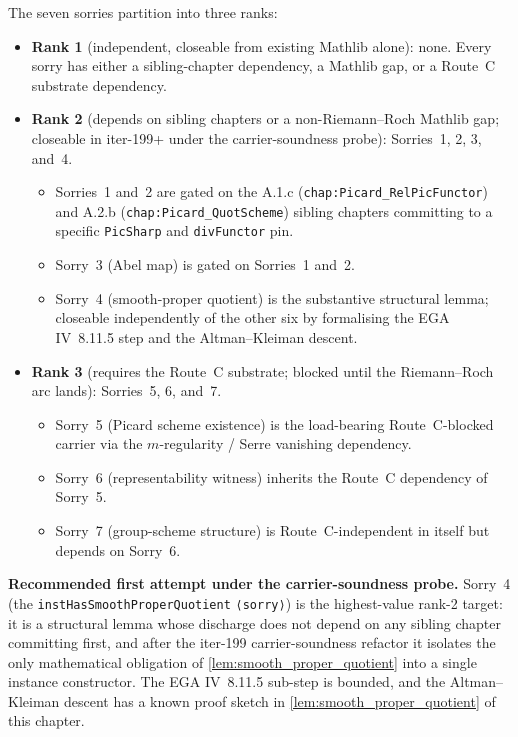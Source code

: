 The seven sorries partition into three ranks:
\begin{itemize}
  \item \textbf{Rank 1} (independent, closeable from existing
    Mathlib alone): none. Every sorry has either a sibling-chapter
    dependency, a Mathlib gap, or a Route~C substrate dependency.
  \item \textbf{Rank 2} (depends on sibling chapters or a
    non-Riemann--Roch Mathlib gap; closeable in iter-199+ under the
    carrier-soundness probe): Sorries~1, 2, 3, and~4.
    \begin{itemize}
      \item Sorries~1 and~2 are gated on the A.1.c
        (\texttt{chap:Picard\_RelPicFunctor}) and A.2.b
        (\texttt{chap:Picard\_QuotScheme}) sibling chapters
        committing to a specific \texttt{PicSharp} and
        \texttt{divFunctor} pin.
      \item Sorry~3 (Abel map) is gated on Sorries~1 and~2.
      \item Sorry~4 (smooth-proper quotient) is the substantive
        structural lemma; closeable independently of the other six
        by formalising the EGA IV~8.11.5 step and the Altman--Kleiman
        descent.
    \end{itemize}
  \item \textbf{Rank 3} (requires the Route~C substrate; blocked
    until the Riemann--Roch arc lands): Sorries~5, 6, and~7.
    \begin{itemize}
      \item Sorry~5 (Picard scheme existence) is the load-bearing
        Route~C-blocked carrier via the $m$-regularity / Serre
        vanishing dependency.
      \item Sorry~6 (representability witness) inherits the Route~C
        dependency of Sorry~5.
      \item Sorry~7 (group-scheme structure) is Route~C-independent
        in itself but depends on Sorry~6.
    \end{itemize}
\end{itemize}

\medskip

\textbf{Recommended first attempt under the carrier-soundness
probe.} Sorry~4 (the \texttt{instHasSmoothProperQuotient}
\texttt{⟨sorry⟩}) is the highest-value rank-2 target: it is a
structural lemma whose discharge does not depend on any sibling
chapter committing first, and after the iter-199 carrier-soundness
refactor it isolates the only mathematical obligation of
\cref{lem:smooth_proper_quotient} into a single instance
constructor. The EGA IV~8.11.5 sub-step is bounded, and the
Altman--Kleiman descent has a known proof sketch in
\cref{lem:smooth_proper_quotient} of this chapter.

